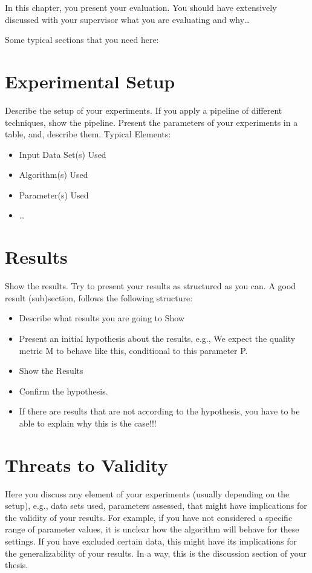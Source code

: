 In this chapter, you present your evaluation.
You should have extensively discussed with your supervisor what you are evaluating and why\dots

Some typical sections that you need here:
\section{Experimental Setup}
Describe the setup of your experiments.
If you apply a pipeline of different techniques, show the pipeline.
Present the parameters of your experiments in a table, and, describe them.
Typical Elements:
\begin{itemize}
    \item Input Data Set(s) Used
    \item Algorithm(s) Used
    \item Parameter(s) Used
    \item \dots
\end{itemize}

\section{Results}
Show the results.
Try to present your results as structured as you can.
A good result (sub)section, follows the following structure:
\begin{itemize}
    \item Describe what results you are going to Show
    \item Present an initial hypothesis about the results, e.g., We expect the quality metric M to behave like this, conditional to this parameter P.
    \item Show the Results
    \item Confirm the hypothesis.
    \item If there are results that are not according to the hypothesis, you have to be able to explain why this is the case!!!
\end{itemize}

\section{Threats to Validity}
Here you discuss any element of your experiments (usually depending on the setup), e.g., data sets used, parameters assessed, that might have implications for the validity of your results.
For example, if you have not considered a specific range of parameter values, it is unclear how the algorithm will behave for these settings.
If you have excluded certain data, this might have its implications for the generalizability of your results.
In a way, this is the discussion section of your thesis.
